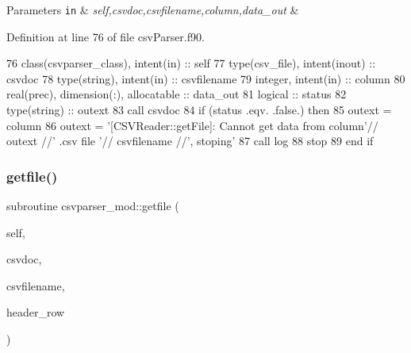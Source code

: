 \begin{DoxyParams}[1]{Parameters}
\mbox{\tt in}  & {\em self,csvdoc,csvfilename,column,data\+\_\+out} & \\
\hline
\end{DoxyParams}


Definition at line 76 of file csv\+Parser.\+f90.


\begin{DoxyCode}
76     \textcolor{keywordtype}{class}(csvparser\_class), \textcolor{keywordtype}{intent(in)} :: self
77     \textcolor{keywordtype}{type}(csv\_file), \textcolor{keywordtype}{intent(inout)} :: csvdoc
78     \textcolor{keywordtype}{type}(string), \textcolor{keywordtype}{intent(in)} :: csvfilename
79     \textcolor{keywordtype}{integer}, \textcolor{keywordtype}{intent(in)} :: column
80     \textcolor{keywordtype}{real(prec)}, \textcolor{keywordtype}{dimension(:)}, \textcolor{keywordtype}{allocatable} :: data\_out
81     \textcolor{keywordtype}{logical} :: status
82     \textcolor{keywordtype}{type}(string) :: outext
83     \textcolor{keyword}{call }csvdoc%
84     \textcolor{keywordflow}{if} (status .eqv. .false.) \textcolor{keywordflow}{then}
85         outext = column
86         outext = \textcolor{stringliteral}{'[CSVReader::getFile]: Cannot get data from column'}// outext //\textcolor{stringliteral}{' .csv file '}// csvfilename
       //\textcolor{stringliteral}{', stoping'}
87         \textcolor{keyword}{call }log%
88         stop
89 \textcolor{keywordflow}{    end if}
\end{DoxyCode}
\mbox{\label{namespacecsvparser__mod_aa200ea4f5e06c67f7a627af0a70450a6}} 
\subsubsection{\texorpdfstring{getfile()}{getfile()}}
{\footnotesize\ttfamily subroutine csvparser\+\_\+mod\+::getfile (\begin{DoxyParamCaption}\item[{class(\mbox{\hyperlink{structcsvparser__mod_1_1csvparser__class}{csvparser\+\_\+class}}), intent(in)}]{self,  }\item[{type(csv\+\_\+file), intent(inout)}]{csvdoc,  }\item[{type(string), intent(in)}]{csvfilename,  }\item[{integer, intent(in)}]{header\+\_\+row }\end{DoxyParamCaption})\hspace{0.3cm}{\ttfamily [private]}}




